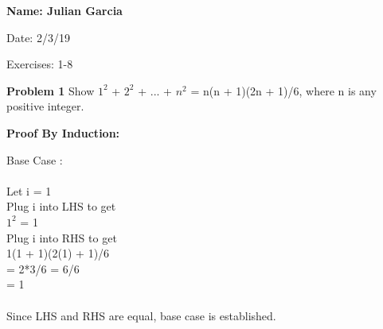 \documentclass[12pt]{article}
\begin{document}
{\bf Name:
Julian Garcia
}
\par
Date:
2/3/19
\par
Exercises:
1-8


\par
\bigskip
{\bf Problem
1
}
Show $1^{2}$ + $2^{2}$ + ... + $n^{2}$ = n(n + 1)(2n + 1)/6, where n is any positive integer.

\par
\bigskip
{\bf Proof By Induction:}
\par
Base Case : \\
\\
	Let i = 1 \\
	Plug i into LHS to get \\
	$1^{2}$ = 1 \\
	Plug i into RHS to get \\
	1(1 + 1)(2(1) + 1)/6 \\
	= 2*3/6 = 6/6\\
	= 1 \\
	\\
Since LHS and RHS are equal, base case is established. \\
\\
\end{document}
